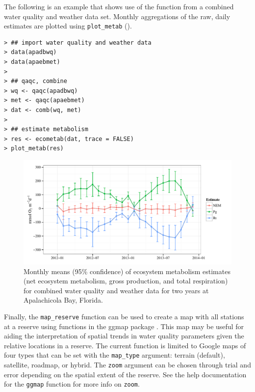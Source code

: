 \documentclass[10pt,letterpaper]{article}\usepackage[]{graphicx}\usepackage[]{color}
\makeatletter
\def\maxwidth{ %
  \ifdim\Gin@nat@width>\linewidth
    \linewidth
  \else
    \Gin@nat@width
  \fi
}
\newenvironment{kframe}{%
 \def\at@end@of@kframe{}%
 \ifinner\ifhmode%
  \def\at@end@of@kframe{\end{minipage}}%
  \begin{minipage}{\columnwidth}%
 \fi\fi%
 \def\FrameCommand##1{\hskip\@totalleftmargin \hskip-\fboxsep
 \colorbox{shadecolor}{##1}\hskip-\fboxsep
     \hskip-\linewidth \hskip-\@totalleftmargin \hskip\columnwidth}%
 \MakeFramed {\advance\hsize-\width
   \@totalleftmargin\z@ \linewidth\hsize
   \@setminipage}}%
 {\par\unskip\endMakeFramed%
 \at@end@of@kframe}
\newenvironment{knitrout}{}{} %
\makeatother
\begin{document}
The following is an example that shows use of the function from a combined water quality and weather data set.  Monthly aggregations of the raw, daily estimates are plotted using \texttt{plot\_metab} ().

\begin{knitrout}\small
{}\color{fgcolor}\begin{kframe}
\begin{verbatim}
> ## import water quality and weather data
> data(apadbwq)
> data(apaebmet)
> 
> ## qaqc, combine
> wq <- qaqc(apadbwq)
> met <- qaqc(apaebmet)
> dat <- comb(wq, met)
> 
> ## estimate metabolism
> res <- ecometab(dat, trace = FALSE)
> plot_metab(res)
\end{verbatim}
\end{kframe}\begin{figure}[!ht]


{\centering \includegraphics[width=\maxwidth]{figure/metab_ex} 

}

\caption[Monthly means (95\% confidence) of ecosystem metabolism estimates (net ecosystem metabolism, gross production, and total respiration) for combined water quality and weather data for two years at Apalachicola Bay, Florida]{Monthly means (95\% confidence) of ecosystem metabolism estimates (net ecosystem metabolism, gross production, and total respiration) for combined water quality and weather data for two years at Apalachicola Bay, Florida.\label{fig:metab_ex}}
\end{figure}


\end{knitrout}

Finally, the \texttt{map\_reserve} function can be used to create a map with all stations at a reserve using functions in the ggmap package \cite{Kahle13}. This map may be useful for aiding the interpretation of spatial trends in water quality parameters given the relative locations in a reserve.  The current function is limited to Google maps of four types that can be set with the \texttt{map\_type} argument: terrain (default), satellite, roadmap, or hybrid.  The \texttt{zoom} argument can be chosen through trial and error depending on the spatial extent of the reserve.  See the help documentation for the \texttt{ggmap} function for more info on \texttt{zoom}.
\end{document}
